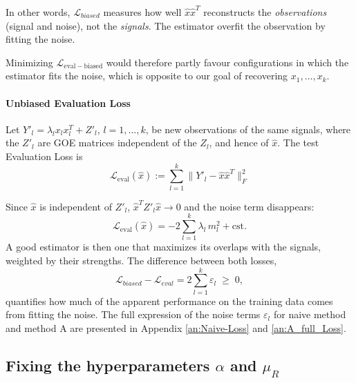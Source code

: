 In other words, $\mathcal{L}_{biased}$ measures how well $\hat{x}\hat{x}^T$ reconstructs the
\emph{observations} (signal and noise), not the \emph{signals}. The estimator overfit the observation by fitting the noise. 

Minimizing
$\mathcal{L}_{\mathrm{eval-biased}}$ would therefore partly favour configurations in which the estimator fits the
noise, which is opposite to our goal of recovering $x_1, \dots, x_k$. 

\paragraph{Unbiased Evaluation Loss}
Let $Y'_l = \lambda_l x_l x_l^T + Z'_l$, $l = 1, \dots, k$, be new observations of the same signals, where
the $Z'_l$ are GOE matrices independent of the $Z_l$, and hence of $\hat{x}$. The test Evaluation Loss is
\begin{equation}
  \mathcal{L}_{\mathrm{eval}}(\hat{x}) := \sum_{l=1}^{k} \big\| Y'_l - \hat{x}\hat{x}^T \big\|_F^2 
\end{equation}

Since $\hat{x}$ is independent of $Z'_l$, $\hat{x}^T Z'_l \hat{x} \to 0$ and the noise term disappears:
\begin{equation}
  \boxed{ \; \mathcal{L}_{\mathrm{eval}}(\hat{x}) = -2 \sum_{l=1}^{k} \lambda_l\, m_l^2 + \mathrm{cst}. \; }
    \label{eq:test_loss}
\end{equation}
A good estimator is then one that maximizes its overlaps with the signals, weighted by their strengths. The
difference between both losses,
\begin{equation}
  \mathcal{L}_{biased} - \mathcal{L}_{eval} = 2 \sum_{l=1}^{k} \varepsilon_l \;\geq\; 0,
\end{equation}
 quantifies how much of the apparent performance on the training data
comes from fitting the noise. The full expression of the noise terms $\varepsilon_l$ for naive method and method A are presented in Appendix \ref{an:Naive-Loss} and \ref{an:A_full_Loss}.




\subsection{Fixing the hyperparameters $\alpha$ and $\mu_R$}
\label{sec:optimal_param}

